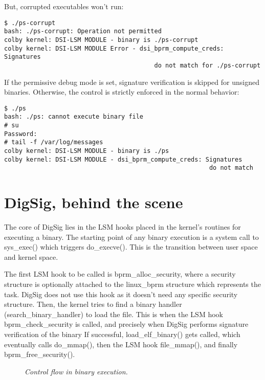 \documentclass{article}
\begin{document}
But, corrupted executables won't run:
\begin{verbatim} 
$ ./ps-corrupt
bash: ./ps-corrupt: Operation not permitted 
colby kernel: DSI-LSM MODULE - binary is ./ps-corrupt
colby kernel: DSI-LSM MODULE Error - dsi_bprm_compute_creds: Signatures 
                                         do not match for ./ps-corrupt
\end{verbatim} 

If the permissive debug mode is set, signature verification is skipped
for unsigned binaries.  Otherwise, the control is strictly enforced in
the normal behavior:

\begin{verbatim} 
$ ./ps
bash: ./ps: cannot execute binary file 
# su 
Password: 
# tail -f /var/log/messages
colby kernel: DSI-LSM MODULE - binary is ./ps
colby kernel: DSI-LSM MODULE - dsi_bprm_compute_creds: Signatures 
                                                        do not match
\end{verbatim} 

\section{DigSig, behind the scene}

The core of DigSig lies in the LSM hooks placed in the kernel's
routines for executing a binary. The starting point of any binary
execution is a system call to sys\_exec() which triggers
do\_execve(). This is the transition between user space and kernel
space.

The first LSM hook to be called is bprm\_alloc\_security,
where a security structure is optionally attached to the
linux\_bprm structure which represents the task. DigSig
does not use this hook as it doesn't need any specific
security structure.
Then, the kernel tries to find a binary handler 
(search\_binary\_handler) to load the file. This is
when the LSM hook bprm\_check\_security is called, and precisely
when DigSig performs signature verification of the binary
If successful, load\_elf\_binary() gets called,
which eventually calls do\_mmap(), then the LSM hook
file\_mmap(), and finally bprm\_free\_security().


\begin{figure}[h]
\begin{center}
\epsfxsize=14cm 
\caption{{\it Control flow in binary execution. }}
\label{fig1}
\end{center}
\end{figure}
\end{document}
